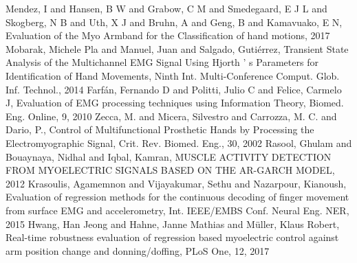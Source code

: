 \begin{multicols}{2}
\begin{thebibliography}{99}
		 Mendez, I and Hansen, B W and Grabow, C M and Smedegaard, E J L and Skogberg, N B and Uth, X J and Bruhn, A and Geng, B and Kamavuako, E N, Evaluation of the Myo Armband for the Classification of hand motions, 2017
		 Mobarak, Michele Pla and Manuel, Juan and Salgado, Guti{\'{e}}rrez, Transient State Analysis of the Multichannel EMG Signal Using Hjorth ' s Parameters for Identification of Hand Movements, Ninth Int. Multi-Conference Comput. Glob. Inf. Technol., 2014
		 Farf{\'{a}}n, Fernando D and Politti, Julio C and Felice, Carmelo J, Evaluation of EMG processing techniques using Information Theory, Biomed. Eng. Online, 9, 2010
		 Zecca, M. and Micera, Silvestro and Carrozza, M. C. and Dario, P., Control of Multifunctional Prosthetic Hands by Processing the Electromyographic Signal, Crit. Rev. Biomed. Eng., 30, 2002
		 Rasool, Ghulam and Bouaynaya, Nidhal and Iqbal, Kamran, MUSCLE ACTIVITY DETECTION FROM MYOELECTRIC SIGNALS BASED ON THE AR-GARCH MODEL, 2012
		 Krasoulis, Agamemnon and Vijayakumar, Sethu and Nazarpour, Kianoush, Evaluation of regression methods for the continuous decoding of finger movement from surface EMG and accelerometry, Int. IEEE/EMBS Conf. Neural Eng. NER, 2015
		 Hwang, Han Jeong and Hahne, Janne Mathias and M{\"{u}}ller, Klaus Robert, Real-time robustness evaluation of regression based myoelectric control against arm position change and donning/doffing, PLoS One, 12, 2017
	\end{thebibliography}
	
\end{multicols}
	
	